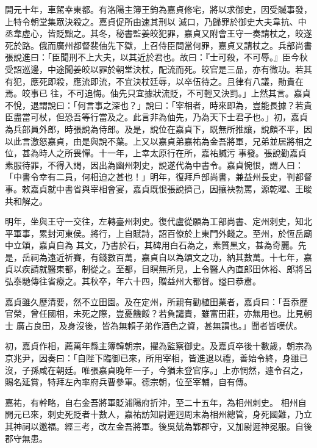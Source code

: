 \begin{pinyinscope}
 開元十年，車駕幸東都。有洛陽主簿王鈞為嘉貞修宅，將以求御史，因受贓事發，上特令朝堂集眾決殺之。嘉貞促所由速其刑以
 滅口，乃歸罪於御史大夫韋抗、中丞韋虛心，皆貶黜之。其冬，秘書監姜皎犯罪，嘉貞又附會王守一奏請杖之，皎遂死於路。俄而廣州都督裴伷先下獄，上召侍臣問當何罪，嘉貞又請杖之。兵部尚書張說進曰：「臣聞刑不上大夫，以其近於君也。故曰：『士可殺，不可辱。』臣今秋受詔巡邊，中途聞姜皎以罪於朝堂決杖，配流而死。皎官是三品，亦有微功。若其有犯，應死即殺，應流即流，不宜決杖廷辱，以卒伍待之。且律有八議，勛貴在焉。皎事已
 往，不可追悔。伷先只宜據狀流貶，不可輕又決罰。」上然其言。嘉貞不悅，退謂說曰：「何言事之深也？」說曰：「宰相者，時來即為，豈能長據？若貴臣盡當可杖，但恐吾等行當及之。此言非為伷先，乃為天下士君子也。」初，嘉貞為兵部員外郎，時張說為侍郎。及是，說位在嘉貞下，既無所推讓，說頗不平，因以此言激怒嘉貞，由是與說不葉。上又以嘉貞弟嘉祐為金吾將軍，兄弟並居將相之位，甚為時人之所畏憚。十一年，上幸太原行在所，嘉祐贓污
 事發。張說勸嘉貞素服待罪，不得入謁，因出為幽州刺史，說遂代為中書令。嘉貞惋恨，謂人曰：「中書令幸有二員，何相迫之甚也！」明年，復拜戶部尚書，兼益州長史，判都督事。敕嘉貞就中書省與宰相會宴，嘉貞既恨張說擠己，因攘袂勃罵，源乾曜、王晙共和解之。



 明年，坐與王守一交往，左轉臺州刺史。復代盧從願為工部尚書、定州刺史，知北平軍事，累封河東侯。將行，上自賦詩，詔百僚於上東門外餞之。至州，於恆岳廟中立頌，嘉貞自為
 其文，乃書於石，其碑用白石為之，素質黑文，甚為奇麗。先是，岳祠為遠近祈賽，有錢數百萬，嘉貞自以為頌文之功，納其數萬。十七年，嘉貞以疾請就醫東都，制從之。至都，目瞑無所見，上令醫人內直郎田休裕、郎將呂弘泰馳傳往省療之。其秋卒，年六十四，贈益州大都督。謚曰恭肅。



 嘉貞雖久歷清要，然不立田園。及在定州，所親有勸植田業者，嘉貞曰：「吾忝歷官榮，曾任國相，未死之際，豈憂饑餒？若負譴責，雖富田莊，亦無用也。比見朝士
 廣占良田，及身沒後，皆為無賴子弟作酒色之資，甚無謂也。」聞者皆嘆伏。



 初，嘉貞作相，薦萬年縣主簿韓朝宗，擢為監察御史。及嘉貞卒後十數歲，朝宗為京兆尹，因奏曰：「自陛下臨御已來，所用宰相，皆進退以禮，善始令終，身雖已沒，子孫咸在朝廷。唯張嘉貞晚年一子，今猶未登官序。」上亦惘然，遽令召之，賜名延賞，特拜左內率府兵曹參軍。德宗朝，位至宰輔，自有傳。



 嘉祐，有幹略，自右金吾將軍貶浦陽府折沖，至二十五年，為相州刺史。
 相州自開元已來，刺史死貶者十數人，嘉祐訪知尉遲迥周末為相州總管，身死國難，乃立其神祠以邀福。經三考，改左金吾將軍。後吳兢為鄴郡守，又加尉遲神冕服。自後郡守無患。




\end{pinyinscope}

